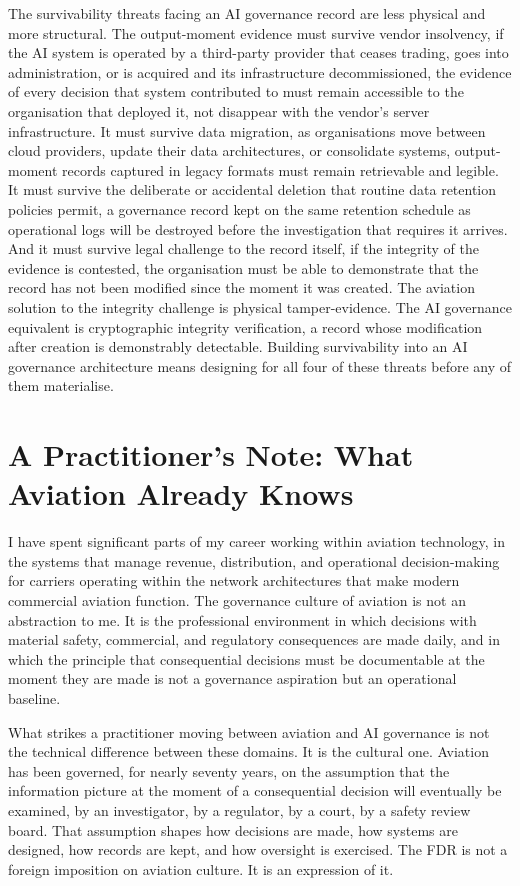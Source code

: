 The survivability threats facing an AI governance record are less physical and more structural. The output-moment evidence must survive vendor insolvency, if the AI system is operated by a third-party provider that ceases trading, goes into administration, or is acquired and its infrastructure decommissioned, the evidence of every decision that system contributed to must remain accessible to the organisation that deployed it, not disappear with the vendor's server infrastructure. It must survive data migration, as organisations move between cloud providers, update their data architectures, or consolidate systems, output-moment records captured in legacy formats must remain retrievable and legible. It must survive the deliberate or accidental deletion that routine data retention policies permit, a governance record kept on the same retention schedule as operational logs will be destroyed before the investigation that requires it arrives. And it must survive legal challenge to the record itself, if the integrity of the evidence is contested, the organisation must be able to demonstrate that the record has not been modified since the moment it was created. The aviation solution to the integrity challenge is physical tamper-evidence. The AI governance equivalent is cryptographic integrity verification, a record whose modification after creation is demonstrably detectable. Building survivability into an AI governance architecture means designing for all four of these threats before any of them materialise.

\scenebreak

\section{A Practitioner's Note: What Aviation Already Knows}

I have spent significant parts of my career working within aviation technology, in the systems that manage revenue, distribution, and operational decision-making for carriers operating within the network architectures that make modern commercial aviation function. The governance culture of aviation is not an abstraction to me. It is the professional environment in which decisions with material safety, commercial, and regulatory consequences are made daily, and in which the principle that consequential decisions must be documentable at the moment they are made is not a governance aspiration but an operational baseline.

What strikes a practitioner moving between aviation and AI governance is not the technical difference between these domains. It is the cultural one. Aviation has been governed, for nearly seventy years, on the assumption that the information picture at the moment of a consequential decision will eventually be examined, by an investigator, by a regulator, by a court, by a safety review board. That assumption shapes how decisions are made, how systems are designed, how records are kept, and how oversight is exercised. The FDR is not a foreign imposition on aviation culture. It is an expression of it.

